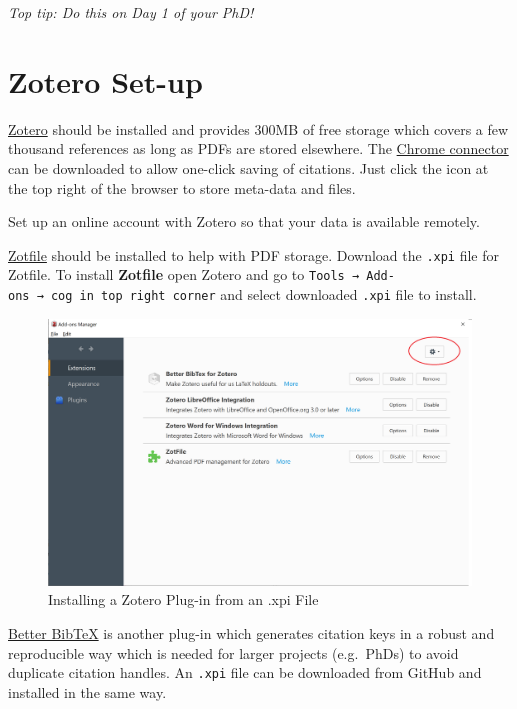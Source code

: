 \documentclass[
]{book}
\begin{document}
\emph{Top tip: Do this on Day 1 of your PhD!}

\hypertarget{zotero-set-up}{%
\section{Zotero Set-up}\label{zotero-set-up}}

\href{https://www.zotero.org/download/}{Zotero} should be installed and provides 300MB of free storage which covers a few thousand references as long as PDFs are stored elsewhere. The \href{https://www.zotero.org/download/}{Chrome connector} can be downloaded to allow one-click saving of citations. Just click the icon at the top right of the browser to store meta-data and files.

Set up an online account with Zotero so that your data is available remotely.

\href{https://www.zotero.org/support/plugins}{Zotfile} should be installed to help with PDF storage. Download the \texttt{.xpi} file for Zotfile. To install \textbf{Zotfile} open Zotero and go to \texttt{Tools\ →\ Add-ons\ →\ cog\ in\ top\ right\ corner} and select downloaded \texttt{.xpi} file to install.

\begin{figure}
\includegraphics[width=36.78in]{img/zotero_add_on_install} \caption{Installing a Zotero Plug-in from an .xpi File}\label{fig:add-on-install}
\end{figure}

\href{https://github.com/retorquere/zotero-better-bibtex/releases/tag/v5.1.76}{Better BibTeX} is another plug-in which generates citation keys in a robust and reproducible way which is needed for larger projects (e.g.~PhDs) to avoid duplicate citation handles. An \texttt{.xpi} file can be downloaded from GitHub and installed in the same way.
\end{document}
